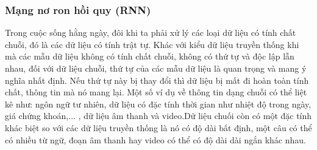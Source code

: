 
\subsubsection{Mạng nơ ron hồi quy (RNN)}

Trong cuộc sống hằng ngày, đôi khi ta phải xử lý các loại dữ liệu có tính chất chuỗi, đó là các dữ liệu có tính trật tự. Khác với kiểu dữ liệu truyền thống khi mà các mẫu dữ liệu không có tính chất chuỗi, không có thứ tự và độc lập lẫn nhau, đối với dữ liệu chuỗi, thứ tự của các mẫu dữ liệu là quan trọng và mang ý nghĩa nhất định. Nếu thứ tự này bị thay đổi thì dữ liệu bị mất đi hoàn toàn tính chất, thông tin mà nó mang lại. Một số ví dụ về thông tin dạng chuỗi có thể liệt kê như: ngôn ngữ tư nhiên, dữ liệu có đặc tính thời gian như nhiệt độ trong ngày, giá chứng khoán,... , dữ liệu âm thanh và video.Dữ liệu chuối còn có một đặc tính khác biệt so với các dữ liệu truyền thống là nó có độ dài bất định, một câu có thể có nhiều từ ngữ, đoạn âm thanh hay video có thể có độ dài dài ngắn khác nhau. 

